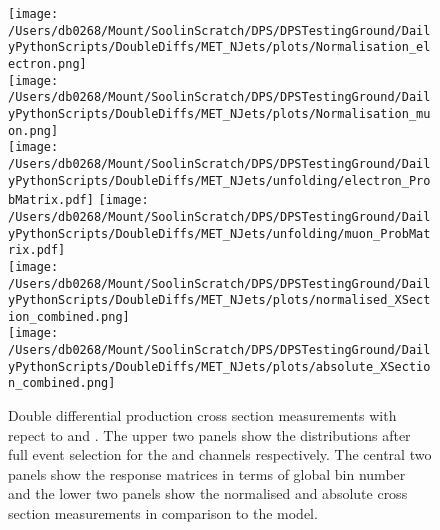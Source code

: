 \begin{figure}[htpb]
	\centering
	\texttt{[image: /Users/db0268/Mount/SoolinScratch/DPS/DPSTestingGround/DailyPythonScripts/DoubleDiffs/MET\_NJets/plots/Normalisation\_electron.png]} \\
	\texttt{[image: /Users/db0268/Mount/SoolinScratch/DPS/DPSTestingGround/DailyPythonScripts/DoubleDiffs/MET\_NJets/plots/Normalisation\_muon.png]} \\
	\vspace{0.8cm}
	\texttt{[image: /Users/db0268/Mount/SoolinScratch/DPS/DPSTestingGround/DailyPythonScripts/DoubleDiffs/MET\_NJets/unfolding/electron\_ProbMatrix.pdf]}
	\texttt{[image: /Users/db0268/Mount/SoolinScratch/DPS/DPSTestingGround/DailyPythonScripts/DoubleDiffs/MET\_NJets/unfolding/muon\_ProbMatrix.pdf]} \\
	\vspace{0.8cm}
	\texttt{[image: /Users/db0268/Mount/SoolinScratch/DPS/DPSTestingGround/DailyPythonScripts/DoubleDiffs/MET\_NJets/plots/normalised\_XSection\_combined.png]} \\
	\texttt{[image: /Users/db0268/Mount/SoolinScratch/DPS/DPSTestingGround/DailyPythonScripts/DoubleDiffs/MET\_NJets/plots/absolute\_XSection\_combined.png]} \\
	\vspace{0.4cm}
	\caption[Double differential \ttbar{} production cross section measurements with repect to \ptmiss{} and \NJET{}. The upper two panels show the distributions after full event selection for the \eJets{} and \muJets{} channels respectively. The central two panels show the response matrices in terms of global bin number and the lower two panels show the normalised and absolute cross section measurements in comparison to the \powhegpythia{} model.]{Double differential \ttbar{} production cross section measurements with repect to \ptmiss{} and \NJET{}. The upper two panels show the distributions after full event selection for the \eJets{} and \muJets{} channels respectively. The central two panels show the response matrices in terms of global bin number and the lower two panels show the normalised and absolute cross section measurements in comparison to the \powhegpythia{} model.}
	\label{fig:MET_NJET}
\end{figure}





